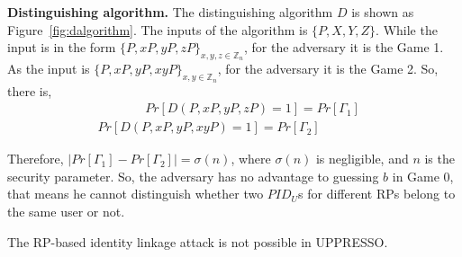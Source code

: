 \noindent\textbf{Distinguishing algorithm.} The distinguishing algorithm $D$ is shown as Figure~\ref{fig:dalgorithm}. 
The inputs of the algorithm is $\{P,X,Y,Z\}$. While the input is in the form $\{P,xP,yP,zP\}_{x,y,z \in \mathbb{Z}_n}$, for the adversary it is the Game 1. As the input is $\{P,xP,yP,xyP\}_{x,y \in \mathbb{Z}_n}$, for the adversary it is the Game 2. So, there is,
\vspace{-\topsep}
\begin{multline*}
   \ \ \ \ \ \ \ \ \ \ \ \ \ \ \ \ \  Pr[D(P,xP,yP,zP)=1]=Pr[{\Gamma_1}]\\
   Pr[D(P,xP,yP,xyP)=1]=Pr[{\Gamma_2}]\ \ \ \ \ \ \ \ \ \ \ \ \ \ \ \ \ \ 
\end{multline*}

\vspace{-\topsep}
Therefore, $|Pr[\Gamma_1]-Pr[\Gamma_2]|=\sigma(n)$, where $\sigma(n)$ is negligible, and $n$ is the security parameter. So, the adversary has no advantage to guessing $b$ in Game 0, that means he cannot distinguish whether two $PID_U$s for different RPs belong to the same user or not. 

The RP-based identity linkage attack is not possible in UPPRESSO.

